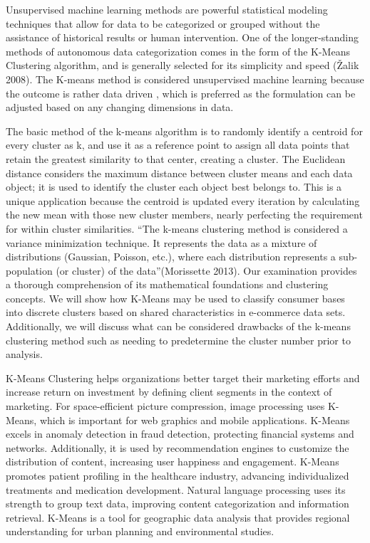 \documentclass[
  letterpaper,
  DIV=11,
  numbers=noendperiod]{scrreprt}
\begin{document}
Unsupervised machine learning methods are powerful statistical modeling
techniques that allow for data to be categorized or grouped without the
assistance of historical results or human intervention. One of the
longer-standing methods of autonomous data categorization comes in the
form of the K-Means Clustering algorithm, and is generally selected for
its simplicity and speed (Žalik 2008). The K-means method is considered
unsupervised machine learning because the outcome is rather data driven
, which is preferred as the formulation can be adjusted based on any
changing dimensions in data.

The basic method of the k-means algorithm is to randomly identify a
centroid for every cluster as k, and use it as a reference point to
assign all data points that retain the greatest similarity to that
center, creating a cluster. The Euclidean distance considers the maximum
distance between cluster means and each data object; it is used to
identify the cluster each object best belongs to. This is a unique
application because the centroid is updated every iteration by
calculating the new mean with those new cluster members, nearly
perfecting the requirement for within cluster similarities. ``The
k-means clustering method is considered a variance minimization
technique. It represents the data as a mixture of distributions
(Gaussian, Poisson, etc.), where each distribution represents a
sub-population (or cluster) of the data''(Morissette 2013). Our
examination provides a thorough comprehension of its mathematical
foundations and clustering concepts. We will show how K-Means may be
used to classify consumer bases into discrete clusters based on shared
characteristics in e-commerce data sets. Additionally, we will discuss
what can be considered drawbacks of the k-means clustering method such
as needing to predetermine the cluster number prior to analysis.

K-Means Clustering helps organizations better target their marketing
efforts and increase return on investment by defining client segments in
the context of marketing. For space-efficient picture compression, image
processing uses K-Means, which is important for web graphics and mobile
applications. K-Means excels in anomaly detection in fraud detection,
protecting financial systems and networks. Additionally, it is used by
recommendation engines to customize the distribution of content,
increasing user happiness and engagement. K-Means promotes patient
profiling in the healthcare industry, advancing individualized
treatments and medication development. Natural language processing uses
its strength to group text data, improving content categorization and
information retrieval. K-Means is a tool for geographic data analysis
that provides regional understanding for urban planning and
environmental studies.
\end{document}
